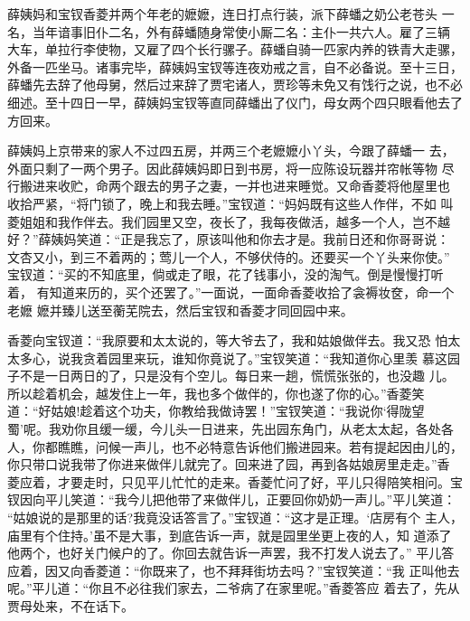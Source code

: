 薛姨妈和宝钗香菱并两个年老的嬷嬷，连日打点行装，派下薛蟠之奶公老苍头
一名，当年谙事旧仆二名，外有薛蟠随身常使小厮二名：主仆一共六人。雇了三辆
大车，单拉行李使物，又雇了四个长行骡子。薛蟠自骑一匹家内养的铁青大走骡，
外备一匹坐马。诸事完毕，薛姨妈宝钗等连夜劝戒之言，自不必备说。至十三日，
薛蟠先去辞了他母舅，然后过来辞了贾宅诸人，贾珍等未免又有饯行之说，也不必
细述。至十四日一早，薛姨妈宝钗等直同薛蟠出了仪门，母女两个四只眼看他去了
方回来。

薛姨妈上京带来的家人不过四五房，并两三个老嬷嬷小丫头，今跟了薛蟠一
去，外面只剩了一两个男子。因此薛姨妈即日到书房，将一应陈设玩器并帘帐等物
尽行搬进来收贮，命两个跟去的男子之妻，一并也进来睡觉。又命香菱将他屋里也
收拾严紧，“将门锁了，晚上和我去睡。”宝钗道：“妈妈既有这些人作伴，不如
叫菱姐姐和我作伴去。我们园里又空，夜长了，我每夜做活，越多一个人，岂不越
好？”薛姨妈笑道：“正是我忘了，原该叫他和你去才是。我前日还和你哥哥说：
文杏又小，到三不着两的；莺儿一个人，不够伏侍的。还要买一个丫头来你使。”
宝钗道：“买的不知底里，倘或走了眼，花了钱事小，没的淘气。倒是慢慢打听着，
有知道来历的，买个还罢了。”一面说，一面命香菱收拾了衾褥妆奁，命一个老嬷
嬷并臻儿送至蘅芜院去，然后宝钗和香菱才同回园中来。

香菱向宝钗道：“我原要和太太说的，等大爷去了，我和姑娘做伴去。我又恐
怕太太多心，说我贪着园里来玩，谁知你竟说了。”宝钗笑道：“我知道你心里羡
慕这园子不是一日两日的了，只是没有个空儿。每日来一趟，慌慌张张的，也没趣
儿。所以趁着机会，越发住上一年，我也多个做伴的，你也遂了你的心。”香菱笑
道：“好姑娘!趁着这个功夫，你教给我做诗罢！”宝钗笑道：“我说你‘得陇望
蜀’呢。我劝你且缓一缓，今儿头一日进来，先出园东角门，从老太太起，各处各
人，你都瞧瞧，问候一声儿，也不必特意告诉他们搬进园来。若有提起因由儿的，
你只带口说我带了你进来做伴儿就完了。回来进了园，再到各姑娘房里走走。”香
菱应着，才要走时，只见平儿忙忙的走来。香菱忙问了好，平儿只得陪笑相问。宝
钗因向平儿笑道：“我今儿把他带了来做伴儿，正要回你奶奶一声儿。”平儿笑道：
“姑娘说的是那里的话?我竟没话答言了。”宝钗道：“这才是正理。‘店房有个
主人，庙里有个住持。’虽不是大事，到底告诉一声，就是园里坐更上夜的人，知
道添了他两个，也好关门候户的了。你回去就告诉一声罢，我不打发人说去了。”
平儿答应着，因又向香菱道：“你既来了，也不拜拜街坊去吗？”宝钗笑道：“我
正叫他去呢。”平儿道：“你且不必往我们家去，二爷病了在家里呢。”香菱答应
着去了，先从贾母处来，不在话下。

